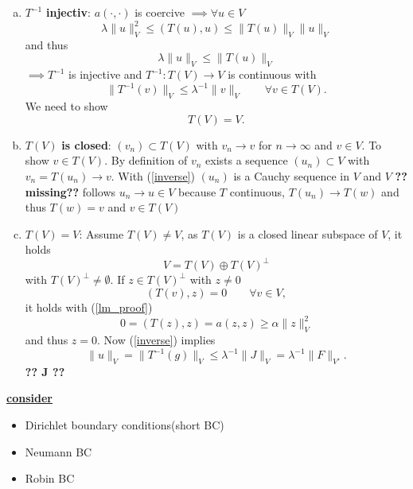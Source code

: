 \begin{enumerate}[(a)]
	\item  $T^{-1}$\textbf{ injectiv}: \enter
	$a(\cdot, \cdot)$ is coercive $\implies \forall u \in V$
	\begin{equation*}
		\lambda \|u\|^2_V \leq (T(u),u) \leq \|T(u)\|_V\|u\|_V
	\end{equation*}
	and thus 
	\begin{equation}\label{inverse}
		\lambda \|u\|_V \leq \|T(u)\|_V
	\end{equation}
	$\implies T^{-1}$ is injective and $T^{-1}: T(V) \to V$ is continuous with
	\begin{equation*}
		\|T^{-1}(v)\|_V \leq \lambda^{-1}\|v\|_V \qquad \forall v \in T(V). 
	\end{equation*}
	We need to show
	\begin{equation*}
		T(V) = V.
	\end{equation*}
	\item $T(V)$ \textbf{is closed}:\enter
	 $(v_n) \subset T(V)$ with $v_n \to v$ for $n \to \infty$ and $v \in V$. To show $v \in T(V)$. By definition of $v_n$ exists a sequence $(u_n) \subset V$ with $v_n = T(u_n) \to v$. With (\ref{inverse}) $(u_n)$ is a Cauchy sequence in $V$ and $V$ \textbf{??missing??} follows $u_n \to u \in V$ because $T$ continuous, $T(u_n) \to T(w)$ and thus $T(w)=v$ and $v \in T(V)$\enter
	\item $T(V) = V$:\enter
	 Assume $T(V) \neq V$, as $T(V)$ is a closed linear subspace of $V$, it holds 
	\begin{equation*}
		V = T(V) \oplus T(V)^\perp
	\end{equation*}
	with $T(V)^\perp \neq \emptyset$. If $z \in T(V)^\perp $ with $z \neq 0$
	\begin{equation*}
		(T(v),z) = 0 \qquad \forall v \in V,
	\end{equation*}
	it holds with (\ref{lm_proof}) 
	\begin{equation*}
		0 = (T(z),z) = a(z,z) \geq \alpha \|z\|^2_V
	\end{equation*}
	and thus $z = 0$. \marvosymLightning\enter
	Now (\ref{inverse}) implies
	\begin{equation*}
		\|u\|_V = \|T^{-1}(g)\|_V \leq \lambda^{-1}\|J\|_V = \lambda^{-1}\|F\|_{V'}.
	\end{equation*}
	\textbf{?? J ??}
\end{enumerate}

\textbf{\underline{consider}}
\begin{itemize}
	\item Dirichlet boundary conditions(short BC)\enter
	\item Neumann BC\enter
	\item Robin BC
\end{itemize}


